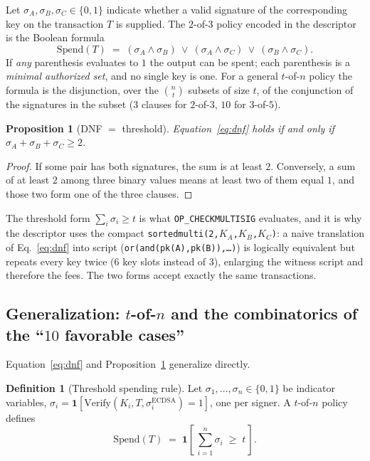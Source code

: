 \documentclass[11pt,a4paper]{article}
\theoremstyle{plain}
\newtheorem{proposition}[theorem]{Proposition}
\theoremstyle{definition}
\newtheorem{definition}[theorem]{Definition}
\begin{document}
Let $\sigma_A,\sigma_B,\sigma_C\in\{0,1\}$ indicate whether a valid signature
of the corresponding key on the transaction $T$ is supplied. The $2$-of-$3$
policy encoded in the descriptor is the Boolean formula
\begin{equation}\label{eq:dnf}
    \mathrm{Spend}(T)\;=\;(\sigma_A\wedge\sigma_B)\ \vee\ (\sigma_A\wedge\sigma_C)\ \vee\ (\sigma_B\wedge\sigma_C).
\end{equation}
If \emph{any} parenthesis evaluates to $1$ the output can be spent; each
parenthesis is a \emph{minimal authorized set}, and no single key is one.
For a general $t$-of-$n$ policy the formula is the disjunction, over the
$\binom{n}{t}$ subsets of size $t$, of the conjunction of the signatures in the
subset ($3$ clauses for $2$-of-$3$, $10$ for $3$-of-$5$).

\begin{proposition}[DNF $=$ threshold]\label{prop:dnf}
Equation~\eqref{eq:dnf} holds if and only if $\sigma_A+\sigma_B+\sigma_C\ge2$.
\end{proposition}
\begin{proof}
If some pair has both signatures, the sum is at least $2$. Conversely, a sum of
at least $2$ among three binary values means at least two of them equal $1$,
and those two form one of the three clauses.
\end{proof}

The threshold form $\sum_i\sigma_i\ge t$ is what
\texttt{OP\_CHECKMULTISIG} evaluates, and it is why the descriptor uses the
compact \texttt{sortedmulti(2,$K_A$,$K_B$,$K_C$)}: a naive translation of
Eq.~\eqref{eq:dnf} into script (\texttt{or(and(pk(A),pk(B)),\ldots)}) is
logically equivalent but repeats every key twice ($6$ key slots instead of $3$),
enlarging the witness script and therefore the fees. The two forms accept
exactly the same transactions.

\subsection{Generalization: $t$-of-$n$ and the combinatorics of the ``$10$ favorable cases''}
\label{sec:tofn-general}

Equation~\eqref{eq:dnf} and Proposition~\ref{prop:dnf} generalize directly.

\begin{definition}[Threshold spending rule]\label{def:spend-general}
Let $\sigma_1,\dots,\sigma_n\in\{0,1\}$ be indicator variables,
$\sigma_i=\mathbf{1}[\mathrm{Verify}(K_i,T,\sigma_i^{\mathrm{ECDSA}})=1]$, one per
signer. A $t$-of-$n$ policy defines
\begin{equation}\label{eq:threshold-general}
    \mathrm{Spend}(T)\;=\;\mathbf{1}\!\left[\,\sum_{i=1}^{n}\sigma_i \;\ge\; t\,\right].
\end{equation}
\end{definition}
\end{document}
